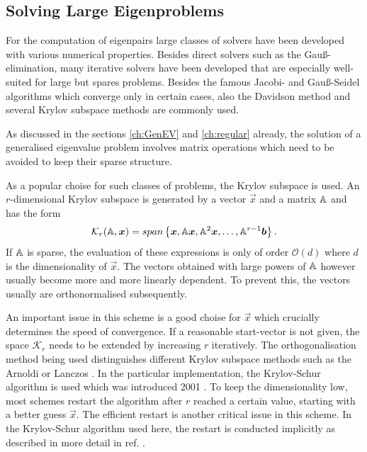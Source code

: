 \subsection{Solving Large Eigenproblems}
\label{ch:ghep}
For the computation of eigenpairs large classes of solvers have been developed with various numerical properties.
Besides direct solvers such as the Gau\ss-elimination, many iterative solvers have been developed that are especially well-suited for large but spares problems.
Besides the famous Jacobi- and Gau\ss-Seidel algorithms which converge only in certain cases, also the Davidson method and several Krylov subspace methods are commonly used.

As discussed in the sections \ref{ch:GenEV} and \ref{ch:regular} already, the solution of a generalised eigenvalue problem involves matrix operations which need to be avoided to keep their sparse structure.

As a popular choise for such classes of problems, the Krylov subspace is used.
An $r$-dimensional Krylov subspace is generated by a vector $\vec{x}$ and a matrix $\mathbb{A}$ and has the form
\begin{equation}
   \mathcal{K}_r(\mathbb{A},\bm{x})=span\left\{ \bm{x},\mathbb{A}\bm{x},\mathbb{A}^2\bm{x},\hdots,\mathbb{A}^{r-1}\bm{b} \right\}.
\end{equation}
If $\mathbb{A}$ is sparse, the evaluation of these expressions is only of order $\mathcal{O}(d)$ where $d$ is the dimensionality of $\vec{x}$.
The vectors obtained with large powers of $\mathbb{A}$ however usually become more and more linearly dependent.
To prevent this, the vectors usually are orthonormalised subsequently.

An important issue in this scheme is a good choise for $\vec{x}$ which crucially determines the speed of convergence.
If a reasonable start-vector is not given, the space $\mathcal{K}_r$ needs to be extended by increasing $r$ iteratively.
The orthogonalisation method being used distinguishes different Krylov subspace methods such as the Arnoldi \cite{str-4} or Lanczos \cite{str-5}.
In the particular implementation, the Krylov-Schur algorithm is used \cite{str-7} which was introduced 2001 \cite{KrSch}.
To keep the dimensionality low, most schemes restart the algorithm after $r$ reached a certain value, starting with a better guess $\vec{x}$.
The efficient restart is another critical issue in this scheme.
In the Krylov-Schur algorithm \cite{KrSch} used here, the restart is conducted implicitly as described in more detail in ref. \cite{str-7}.

